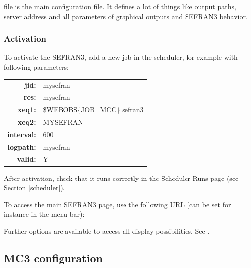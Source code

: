  file is the main configuration file. It defines a lot of things like output paths, server address and all parameters of graphical outputs and SEFRAN3 behavior.






\subsubsection{Activation}

To activate the SEFRAN3, add a new job in the scheduler, for example with following parameters:

\begin{tabular}{rl}
\textbf{jid:}      & mysefran \\
\textbf{res:}      & mysefran \\
\textbf{xeq1:}     & \$WEBOBS\{JOB\_MCC\} sefran3 \\
\textbf{xeq2:}     & MYSEFRAN \\
\textbf{interval:} & 600 \\
\textbf{logpath:}  & mysefran \\
\textbf{valid:}    & Y \\
\end{tabular}

After activation, check that it runs correctly in the Scheduler Runs page (see Section \ref{scheduler}).

To access the main SEFRAN3 page, use the following URL (can be set for instance in the menu bar):


Further options are available to access all display possibilities. See .


\subsection{MC3 configuration}





